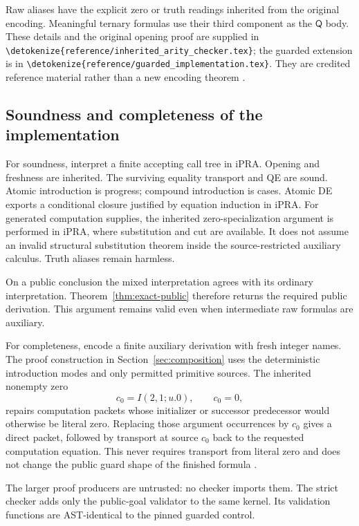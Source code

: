 \documentclass[11pt,letterpaper]{article}
\theoremstyle{definition}\newtheorem{definition}[theorem]{Definition}
\theoremstyle{remark}\newtheorem{remark}[theorem]{Remark}
\newcommand{\Q}{\mathsf Q}
\newcommand{\file}[1]{\expandafter\nolinkurl\expandafter{\detokenize{#1}}}
\begin{document}
Raw aliases have the explicit zero or truth readings inherited from the
original encoding. Meaningful ternary formulas use their third component
as the $\Q$ body. These details and the original opening proof are supplied
in \file{reference/inherited_arity_checker.tex}; the guarded extension is
in \file{reference/guarded_implementation.tex}. They are credited reference
material rather than a new encoding theorem \cite{arity,guarded-impl}.

\subsection{Soundness and completeness of the implementation}

For soundness, interpret a finite accepting call tree in iPRA. Opening and
freshness are inherited. The surviving equality transport and QE are sound.
Atomic introduction is progress; compound introduction is cases. Atomic DE
exports a conditional closure justified by equation induction in iPRA.
For generated computation supplies, the inherited zero-specialization
argument is performed in iPRA, where substitution and cut are available.
It does not assume an invalid structural substitution theorem inside the
source-restricted auxiliary calculus. Truth aliases remain harmless.

On a public conclusion the mixed interpretation agrees with its ordinary
interpretation. Theorem~\ref{thm:exact-public} therefore returns the required
public derivation. This argument remains valid even when intermediate raw
formulas are auxiliary.

For completeness, encode a finite auxiliary derivation with fresh integer
names. The proof construction in Section~\ref{sec:composition} uses the
deterministic introduction modes and only permitted primitive sources.
The inherited nonempty zero
\[
c_0=I(2,1;u.0),\qquad c_0=0,
\]
repairs computation packets whose initializer or successor predecessor
would otherwise be literal zero. Replacing those argument occurrences by
$c_0$ gives a direct packet, followed by transport at source $c_0$ back to
the requested computation equation. This never requires transport from
literal zero and does not change the public guard shape of the finished
formula \cite{source,arity}.

The larger proof producers are untrusted: no checker imports them. The
strict checker adds only the public-goal validator to the same kernel.
Its validation functions are AST-identical to the pinned guarded control.
\end{document}
